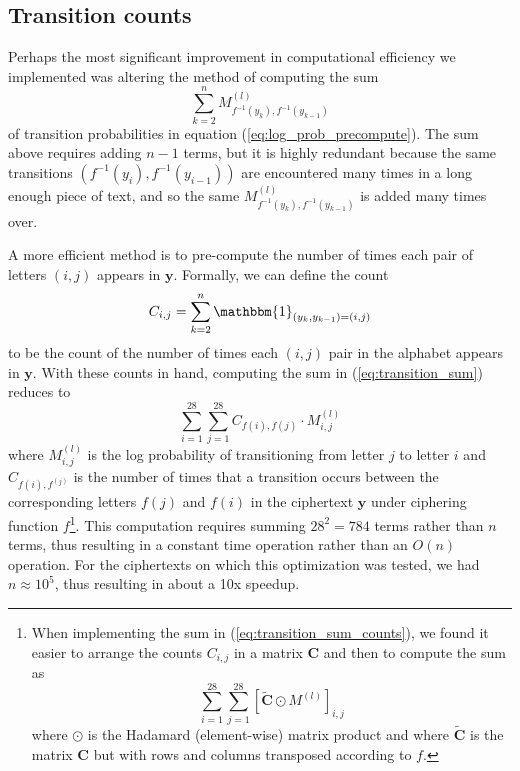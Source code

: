 \documentclass{article}
\begin{document}
\subsection{Transition counts}\label{subsec:transition_counts}

Perhaps the most significant improvement in computational efficiency we implemented was altering the method of computing the sum
\begin{equation}\label{eq:transition_sum}
    \sum_{k=2}^n M^{(l)}_{f^{-1}(y_k),f^{-1}(y_{k-1})}
\end{equation}
of transition probabilities in equation (\ref{eq:log_prob_precompute}). The sum above requires adding $n-1$ terms, but it is highly redundant because the same transitions $\left( f^{-1}(y_i),f^{-1}(y_{i-1}) \right)$ are encountered many times in a long enough piece of text, and so the same $M^{(l)}_{f^{-1}(y_k),f^{-1}(y_{k-1})}$ is added many times over.

A more efficient method is to pre-compute the number of times each pair of letters $(i,j)$ appears in $\mathbf{y}$. Formally, we can define the count
\begin{equation}
    C_{i,j} = \sum_{k=2}^n \mathbbm{1}_{(y_k, y_{k-1}) = (i,j)}
\end{equation}
to be the count of the number of times each $(i,j)$ pair in the alphabet appears in $\mathbf{y}$. With these counts in hand, computing the sum in (\ref{eq:transition_sum}) reduces to
\begin{equation}\label{eq:transition_sum_counts}
    \sum_{i=1}^{28} \sum_{j=1}^{28} C_{f(i), f(j)} \cdot M^{(l)}_{i, j}
\end{equation}
where $M^{(l)}_{i, j}$ is the log probability of transitioning from letter $j$ to letter $i$ and $C_{f(i), f^(j)}$ is the number of times that a transition occurs between the corresponding letters $f(j)$ and $f(i)$ in the ciphertext $\mathbf{y}$ under ciphering function $f$\footnote{When implementing the sum in (\ref{eq:transition_sum_counts}), we found it easier to arrange the counts $C_{i,j}$ in a matrix $\mathbf{C}$ and then to compute the sum as $$\sum_{i=1}^{28} \sum_{j=1}^{28} \left[ \widetilde{\mathbf{C}} \odot M^{(l)} \right]_{i,j}$$ where $\odot$ is the Hadamard (element-wise) matrix product and where $\widetilde{\mathbf{C}}$ is the matrix $\mathbf{C}$ but with rows and columns transposed according to $f$.}. This computation requires summing $28^2 = 784$ terms rather than $n$ terms, thus resulting in a constant time operation rather than an $O(n)$ operation. For the ciphertexts on which this optimization was tested, we had $n \approx 10^5$, thus resulting in about a 10x speedup.
\end{document}
